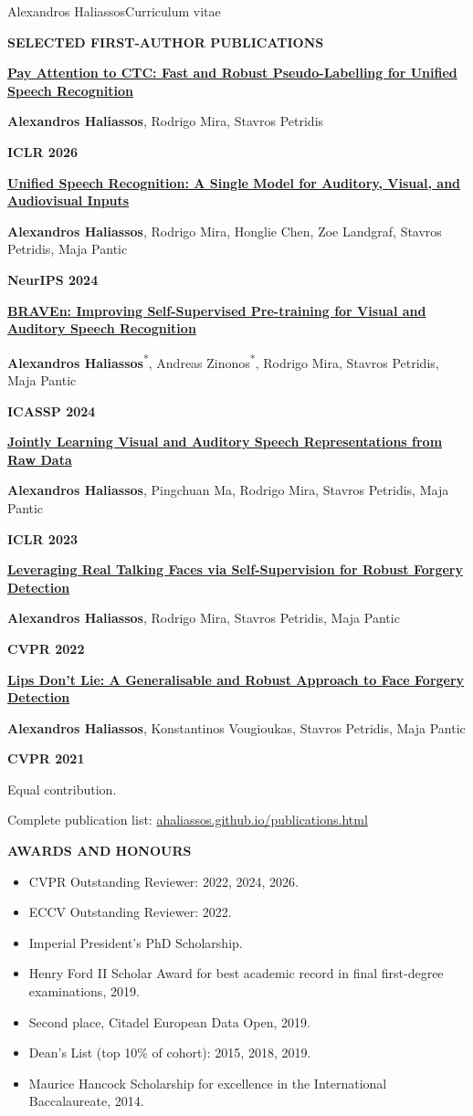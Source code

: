\documentclass[10pt,a4paper]{article}
\newcommand{\cvsection}[1]{%
  \par\addvspace{14pt}%
  {\color{navy}\fontsize{10.5}{13}\selectfont\bfseries\MakeUppercase{#1}\par}%
  \nobreak\vspace{3pt}{\color{rule}\hrule height 0.45pt}%
  \nobreak\vspace{8pt}}
\newcommand{\entrygap}{\par\vspace{7pt}}
\newcommand{\paper}[4]{%
  \begin{minipage}{\linewidth}
    {\fontsize{11.5}{14}\selectfont\bfseries\href{#1}{#2}\par}\vspace{3pt}
    {\fontsize{10}{12.5}\selectfont #3\par}\vspace{2pt}
    {\fontsize{9.5}{12}\selectfont\bfseries\color{navy}#4\par}
  \end{minipage}\par\vspace{12pt}}
\begin{document}
\entrygap

\newpage
{\fontsize{10}{13}\selectfont\color{muted}Alexandros Haliassos\hfill Curriculum vitae\par}
\cvsection{Selected first-author publications}
\paper{https://arxiv.org/abs/2602.19316}{Pay Attention to CTC: Fast and Robust Pseudo-Labelling for Unified Speech Recognition}{\textbf{Alexandros Haliassos}, Rodrigo Mira, Stavros Petridis}{ICLR 2026}
\paper{https://arxiv.org/abs/2411.02256}{Unified Speech Recognition: A Single Model for Auditory, Visual, and Audiovisual Inputs}{\textbf{Alexandros Haliassos}, Rodrigo Mira, Honglie Chen, Zoe Landgraf, Stavros Petridis, Maja Pantic}{NeurIPS 2024}
\paper{https://arxiv.org/abs/2404.02098}{BRAVEn: Improving Self-Supervised Pre-training for Visual and Auditory Speech Recognition}{\textbf{Alexandros Haliassos}\textsuperscript{*}, Andreas Zinonos\textsuperscript{*}, Rodrigo Mira, Stavros Petridis, Maja Pantic}{ICASSP 2024}
\paper{https://arxiv.org/abs/2212.06246}{Jointly Learning Visual and Auditory Speech Representations from Raw Data}{\textbf{Alexandros Haliassos}, Pingchuan Ma, Rodrigo Mira, Stavros Petridis, Maja Pantic}{ICLR 2023}
\paper{https://arxiv.org/abs/2201.07131}{Leveraging Real Talking Faces via Self-Supervision for Robust Forgery Detection}{\textbf{Alexandros Haliassos}, Rodrigo Mira, Stavros Petridis, Maja Pantic}{CVPR 2022}
\paper{https://arxiv.org/abs/2012.07657}{Lips Don't Lie: A Generalisable and Robust Approach to Face Forgery Detection}{\textbf{Alexandros Haliassos}, Konstantinos Vougioukas, Stavros Petridis, Maja Pantic}{CVPR 2021}
{\fontsize{9}{11}\selectfont * Equal contribution.\par}\vspace{4pt}
{\fontsize{9.5}{12}\selectfont Complete publication list: \href{https://ahaliassos.github.io/publications.html}{ahaliassos.github.io/publications.html}\par}
\cvsection{Awards and honours}
\begin{itemize}
  \item CVPR Outstanding Reviewer: 2022, 2024, 2026.
  \item ECCV Outstanding Reviewer: 2022.
  \item Imperial President's PhD Scholarship.
  \item Henry Ford II Scholar Award for best academic record in final first-degree examinations, 2019.
  \item Second place, Citadel European Data Open, 2019.
  \item Dean's List (top 10\% of cohort): 2015, 2018, 2019.
  \item Maurice Hancock Scholarship for excellence in the International Baccalaureate, 2014.
\end{itemize}
\end{document}
